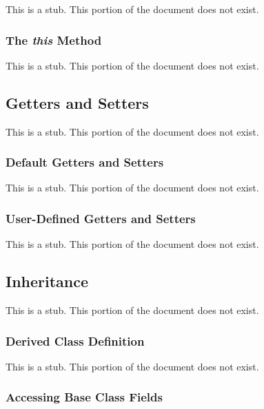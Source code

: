 This is a stub.  This portion of the document does not exist.

\subsubsection{The {\em this} Method}
\label{The_em_this_Method}

This is a stub.  This portion of the document does not exist.

\subsection{Getters and Setters}
\label{Getters_and_Setters}

This is a stub.  This portion of the document does not exist.

\subsubsection{Default Getters and Setters}
\label{Default_Getters_and_Setters}

This is a stub.  This portion of the document does not exist.

\subsubsection{User-Defined Getters and Setters}
\label{User-Defined_Getters_and_Setters}

This is a stub.  This portion of the document does not exist.

\subsection{Inheritance}
\label{Inheritance}

This is a stub.  This portion of the document does not exist.

\subsubsection{Derived Class Definition}
\label{Derived_Class_Definition}

This is a stub.  This portion of the document does not exist.

\subsubsection{Accessing Base Class Fields}
\label{Accessing_Base_Class_Fields}

